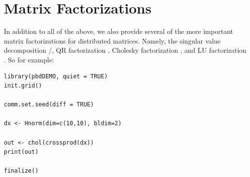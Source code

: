\section{Matrix Factorizations}

In addition to all of the above, we also provide several of the more important matrix factorizations for distributed matrices.  Namely, the singular value decomposition /, QR factorization , Cholesky factorization , and LU factorization .  So for example:

\begin{lstlisting}[language=rr,title=Matrix Factorizations]
library(pbdDEMO, quiet = TRUE)
init.grid()

comm.set.seed(diff = TRUE)

dx <- Hnorm(dim=c(10,10), bldim=2)

out <- chol(crossprod(dx))
print(out)

finalize()
\end{lstlisting}

